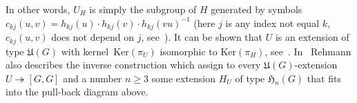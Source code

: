 \documentclass[oneside, 12pt]{amsart}
\theoremstyle{plain}
\numberwithin{equation}{section}
\numberwithin{lemma}{section}
\theoremstyle{remark}
\theoremstyle{definition}
\begin{document}
In other words, $U_H$ is simply the subgroup of $H$ generated by 
symbols $c_{kj}(u, v)=h_{kj}(u) \cdot h_{kj}(v) \cdot h_{kj}(vu)^{-1}$ 
 (here $j$ is any index not equal $k$, $c_{kj}(u,v)$ does not depend on $j$, see~\cite[Proposition~2.1]{Reh78}).
It can be shown that $U$ is an extension of type $\mathfrak{U}(G)$ with kernel~$\mathrm{Ker}(\pi_U)$ 
 isomorphic to $\mathrm{Ker}(\pi_H)$, see~\cite[Propositions~2.2--2.3]{Reh78}.
In~\cite[\S~3]{Reh78} Rehmann also describes the inverse construction which assign to every $\mathfrak{U}(G)$-extension
 $U\twoheadrightarrow [G, G]$ and a number $n\geq 3$ some extension $H_U$ of type $\mathfrak{H}_n(G)$ that fits into the pull-back diagram above.
\end{document}
